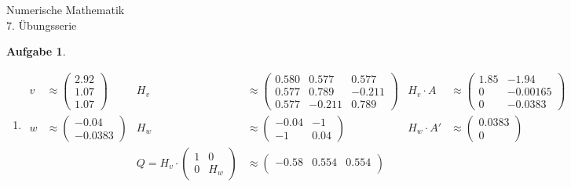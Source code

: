 \documentclass[11pt]{article}
\theoremstyle{break}
\newtheorem{task}{Aufgabe}
\newcommand{\hw}{7}
\begin{document}
\begin{center}
\Large{Numerische Mathematik}\\
\large{\hw. Übungsserie}
\end{center}
\begin{task}
    \hfill\vspace{-5mm}
    \begin{enumerate}[label={(\alph*)}]
        \item \begin{align*}
            v &\approx \begin{pmatrix}
                2.92\\
                1.07\\
                1.07
            \end{pmatrix}& H_v &\approx \begin{pmatrix}
                0.580 & 0.577 & 0.577\\
                0.577 & 0.789 & -0.211\\
                0.577 & -0.211 & 0.789
            \end{pmatrix}& H_v\cdot A &\approx\begin{pmatrix}
                1.85 & -1.94\\
                0 & -0.00165\\
                0 & -0.0383
            \end{pmatrix}\\
            w &\approx\begin{pmatrix}
                -0.04\\
                -0.0383
            \end{pmatrix}& H_w &\approx \begin{pmatrix}
                -0.04 & -1\\
                -1 & 0.04
            \end{pmatrix}& H_w\cdot A' &\approx \begin{pmatrix}
                0.0383\\
                0
            \end{pmatrix}\\
            &&Q = H_v\cdot\begin{pmatrix}
                1 & 0\\
                0 & H_w
            \end{pmatrix} &\approx \begin{pmatrix}
                -0.58 & 0.554 & 0.554\\

\end{pmatrix}
\end{align*}
\end{enumerate}
\end{task}
\end{document}
